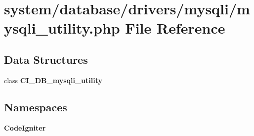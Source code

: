 \section{system/database/drivers/mysqli/mysqli\-\_\-utility.php File Reference}
\label{mysqli__utility_8php}
\subsection*{Data Structures}
\begin{DoxyCompactItemize}
\item 
class {\bf C\-I\-\_\-\-D\-B\-\_\-mysqli\-\_\-utility}
\end{DoxyCompactItemize}
\subsection*{Namespaces}
\begin{DoxyCompactItemize}
\item 
{\bf Code\-Igniter}
\end{DoxyCompactItemize}
